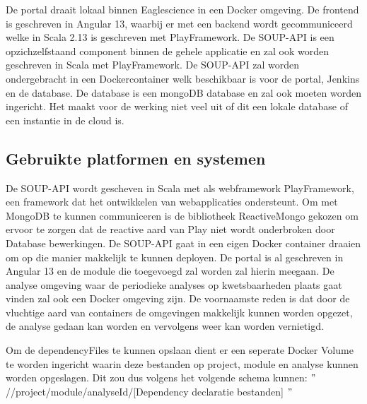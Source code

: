 De portal draait lokaal binnen Eaglescience in een Docker omgeving. De frontend is geschreven in Angular 13, waarbij er met een backend wordt gecommuniceerd welke in Scala 2.13 is geschreven met PlayFramework. De SOUP-API is een opzichzelfstaand component binnen de gehele applicatie en zal ook worden geschreven in Scala met PlayFramework. De SOUP-API zal worden ondergebracht in een Dockercontainer welk beschikbaar is voor de portal, Jenkins en de database. De database is een mongoDB database en zal ook moeten worden ingericht. Het maakt voor de werking niet veel uit of dit een lokale database of een instantie in de cloud is.

\subsection{Gebruikte platformen en systemen}
De SOUP-API wordt gescheven in Scala met als webframework PlayFramework, een framework dat het ontwikkelen van webapplicaties ondersteunt. Om met MongoDB te kunnen communiceren is de bibliotheek ReactiveMongo gekozen om ervoor te zorgen dat de reactive aard van Play niet wordt onderbroken door Database bewerkingen. De SOUP-API gaat in een eigen Docker container draaien om op die manier makkelijk te kunnen deployen. De portal is al geschreven in Angular 13 en de module die toegevoegd zal worden zal hierin meegaan.
De analyse omgeving waar de periodieke analyses op kwetsbaarheden plaats gaat vinden zal ook een Docker omgeving zijn. De voornaamste reden is dat door de vluchtige aard van containers de omgevingen makkelijk kunnen worden opgezet, de analyse gedaan kan worden en vervolgens weer kan worden vernietigd.

Om de dependencyFiles te kunnen opslaan dient er een seperate Docker Volume te worden ingericht waarin deze bestanden op project, module en analyse kunnen worden opgeslagen. Dit zou dus volgens het volgende schema kunnen: $"$//project/module/analyseId/[Dependency declaratie bestanden] $"$
